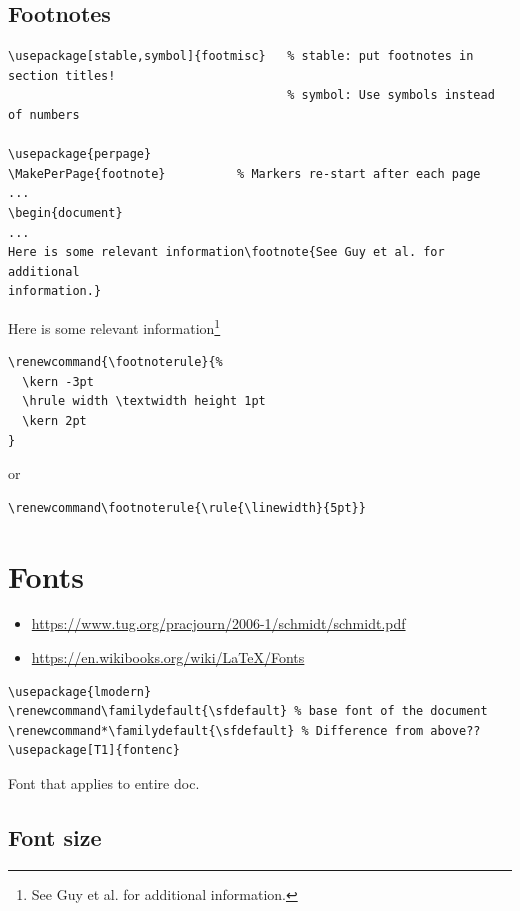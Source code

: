\documentclass{article}
\begin{document}
\subsection{Footnotes}
\begin{lstlisting}
\usepackage[stable,symbol]{footmisc}   % stable: put footnotes in section titles!
                                       % symbol: Use symbols instead of numbers

\usepackage{perpage}
\MakePerPage{footnote}          % Markers re-start after each page
...
\begin{document}
...
Here is some relevant information\footnote{See Guy et al. for additional
information.}
\end{lstlisting}
Here is some relevant information\footnote{See Guy et al. for additional
information.}

\begin{lstlisting}
\renewcommand{\footnoterule}{%
  \kern -3pt
  \hrule width \textwidth height 1pt
  \kern 2pt
}
\end{lstlisting}
or
\begin{lstlisting}
\renewcommand\footnoterule{\rule{\linewidth}{5pt}}
\end{lstlisting}

\newpage
\section{Fonts}
\begin{itemize}
    \item \url{https://www.tug.org/pracjourn/2006-1/schmidt/schmidt.pdf}
    \item \url{https://en.wikibooks.org/wiki/LaTeX/Fonts}
\end{itemize}

\begin{minipage}[t]{0.5\textwidth}
    \begin{lstlisting}
\usepackage{lmodern}
\renewcommand\familydefault{\sfdefault} % base font of the document
\renewcommand*\familydefault{\sfdefault} % Difference from above??
\usepackage[T1]{fontenc}
    \end{lstlisting}
\end{minipage}
\begin{minipage}[t]{0.5\textwidth}
    Font that applies to entire doc.
\end{minipage}

\subsection{Font size}
\end{document}
